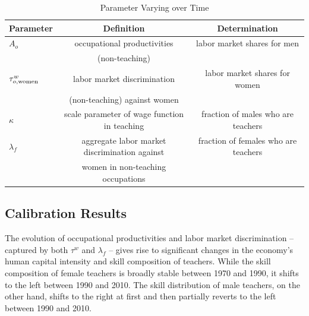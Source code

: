 \documentclass[onehalfspacing,11pt]{article}
\begin{document}
	\begin{table}[h!]
		\centering
		\small
		\begin{tabular}{lcc}
			\toprule
			Parameter & Definition & Determination \\
			\midrule			
			$A_{o}$ & occupational productivities & labor market shares for men  \\
			& (non-teaching) & \\
			$\tau^{w}_{o,{\rm women}}$ & labor market discrimination & labor market shares for women \\
			& (non-teaching) against women & \\
			$\kappa$ & scale parameter of wage function in teaching & fraction of males who are teachers \\
			$\lambda_f$ & aggregate labor market discrimination against & fraction of females who are teachers \\
			& women in non-teaching occupations & \\
			\bottomrule
		\end{tabular}
		\caption{Parameter Varying over Time}
		\label{tab:param_time}
	\end{table}
		
	\subsection{Calibration Results}\label{sec:results}
	The evolution of occupational productivities and labor market discrimination -- captured by both $\tau^w$ and $\lambda_f$ -- gives rise to significant changes in the economy's human capital intensity and skill composition of teachers. While the skill composition of female teachers is broadly stable between 1970 and 1990, it shifts to the left between 1990 and 2010. The skill distribution of male teachers, on the other hand, shifts to the right at first and then partially reverts to the left between 1990 and 2010.
	
\end{document}
